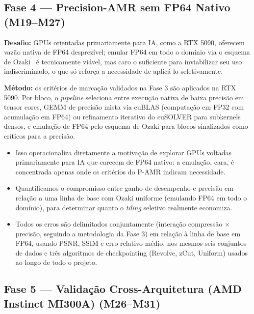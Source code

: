 \documentclass[12pt,a4paper]{article}
\newcommand{\pamr}{P\nobreakdash-AMR}
\begin{document}
\subsection{Fase 4 --- Precision-AMR sem FP64 Nativo (M19--M27)}

\textbf{Desafio:} GPUs orientadas primariamente para IA, como a RTX 5090,
oferecem vazão nativa de FP64 desprezível; emular FP64 em todo o domínio
via o esquema de Ozaki~\cite{uchino2025ozaki} é tecnicamente viável, mas
caro o suficiente para inviabilizar seu uso indiscriminado, o que só
reforça a necessidade de aplicá-lo seletivamente.

\textbf{Método:} os critérios de marcação validados na Fase 3 são
aplicados na RTX 5090. Por bloco, o \emph{pipeline} seleciona entre
execução nativa de baixa precisão em tensor cores, GEMM de precisão mista
via cuBLAS (computação em FP32 com acumulação em FP64) ou refinamento
iterativo do cuSOLVER para subkernels densos, e emulação de FP64 pelo
esquema de Ozaki para blocos sinalizados como críticos para a precisão.

\begin{itemize}
  \item Isso operacionaliza diretamente a motivação de explorar GPUs
        voltadas primariamente para IA que carecem de FP64 nativo: a
        emulação, cara, é concentrada apenas onde os critérios do
        \pamr{} indicam necessidade.
  \item Quantificamos o compromisso entre ganho de desempenho e precisão
        em relação a uma linha de base com Ozaki uniforme (emulando FP64
        em todo o domínio), para determinar quanto o \emph{tiling}
        seletivo realmente economiza.
  \item Todos os erros são delimitados conjuntamente (interação
        compressão $\times$ precisão, seguindo a metodologia da Fase 3)
        em relação à linha de base em FP64, usando PSNR, SSIM e erro
        relativo médio, nos mesmos seis conjuntos de dados e três
        algoritmos de checkpointing (Revolve, zCut, Uniform) usados ao
        longo de todo o projeto.
\end{itemize}

\subsection{Fase 5 --- Validação Cross-Arquitetura (AMD Instinct MI300A)
(M26--M31)}
\end{document}
